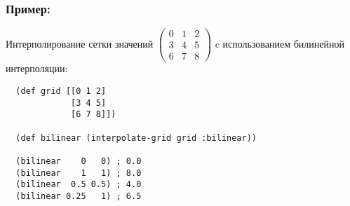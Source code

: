 \subsubsection{Пример:}

Интерполирование сетки значений $\begin{pmatrix} 0 & 1 & 2 \\ 3 & 4 & 5 \\ 6 & 7 & 8 \end{pmatrix}$ c использованием билинейной интерполяции:

\begin{verbatim}
  (def grid [[0 1 2]
             [3 4 5]
             [6 7 8]])

  (def bilinear (interpolate-grid grid :bilinear))

  (bilinear    0   0) ; 0.0
  (bilinear    1   1) ; 8.0
  (bilinear  0.5 0.5) ; 4.0
  (bilinear 0.25   1) ; 6.5
\end{verbatim}




